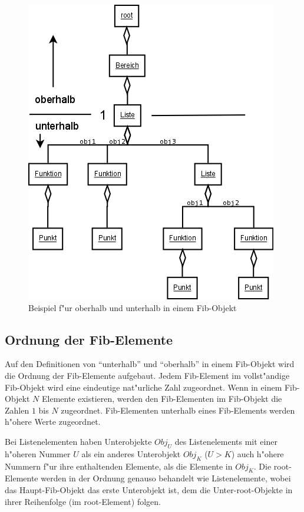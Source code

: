 \begin{figure}[htbp]
\begin{center}
  \includegraphics[scale=0.5]{oberhalb_unterhalb}
\end{center}
\caption{Beispiel f"ur oberhalb und unterhalb in einem Fib-Objekt}
\label{figDirectionFibElements}
\end{figure}


\subsection{Ordnung der Fib-Elemente}
\label{secOrderFibElements}

Auf den Definitionen von ``unterhalb'' und ``oberhalb'' in einem Fib-Objekt wird die Ordnung der Fib-Elemente aufgebaut. Jedem Fib-Element im vollst"andige Fib-Objekt wird eine eindeutige nat"urliche Zahl zugeordnet. Wenn in einem Fib-Objekt $N$ Elemente existieren, werden den Fib-Elementen im Fib-Objekt die Zahlen $1$ bis $N$ zugeordnet. Fib-Elementen unterhalb eines Fib-Elements werden h"ohere Werte zugeordnet.

Bei Listenelementen haben Unterobjekte $Obj_U$ des Listenelements mit einer h"oheren Nummer $U$ als ein anderes Unterobjekt $Obj_K$ ($U>K$) auch h"ohere Nummern f"ur ihre enthaltenden Elemente, als die Elemente in $Obj_K$. Die root-Elemente werden in der Ordnung genauso behandelt wie Listenelemente, wobei das Haupt-Fib-Objekt das erste Unterobjekt ist, dem die Unter-root-Objekte in ihrer Reihenfolge (im root-Element) folgen.

